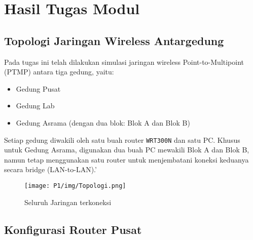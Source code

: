 \section{Hasil Tugas Modul}

\subsection{Topologi Jaringan Wireless Antargedung}

Pada tugas ini telah dilakukan simulasi jaringan wireless Point-to-Multipoint (PTMP) antara tiga gedung, yaitu:

\begin{itemize}
  \item Gedung Pusat
  \item Gedung Lab
  \item Gedung Asrama (dengan dua blok: Blok A dan Blok B)
\end{itemize}

Setiap gedung diwakili oleh satu buah router \texttt{WRT300N} dan satu PC. Khusus untuk Gedung Asrama, digunakan dua buah PC mewakili Blok A dan Blok B, namun tetap menggunakan satu router untuk menjembatani koneksi keduanya secara bridge (LAN-to-LAN).'

\begin{figure}[H]
  \centering
  \texttt{[image: P1/img/Topologi.png]}
  \caption{Seluruh Jaringan terkoneksi}
  \label{fig:connected}
\end{figure}

\subsection{Konfigurasi Router Pusat}


